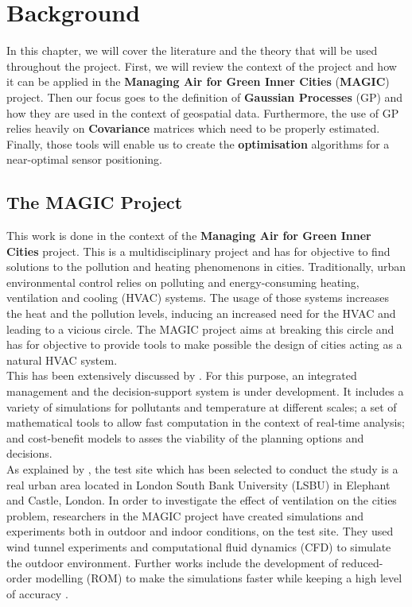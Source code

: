 \chapter{Background}


In this chapter, we will cover the literature and the theory that will be used throughout the project. First, we will review the context of the project and how it can be applied in the \textbf{Managing Air for Green Inner Cities} (\textbf{MAGIC}) project. Then our focus goes to the definition of \textbf{Gaussian Processes} (GP) and how they are used in the context of geospatial data. Furthermore, the use of GP relies heavily on \textbf{Covariance} matrices which need to be properly estimated. Finally, those tools will enable us to create the \textbf{optimisation} algorithms for a near-optimal sensor positioning. 

\section{The MAGIC Project}

This work is done in the context of the \textbf{Managing Air for Green Inner Cities} project. This is a multidisciplinary project and has for objective to find solutions to the pollution and heating phenomenons in cities. Traditionally, urban environmental control relies on polluting and energy-consuming heating, ventilation and cooling (HVAC) systems. The usage of those systems increases the heat and the pollution levels, inducing an increased need for the HVAC and leading to a vicious circle. The MAGIC project aims at breaking this circle and has for objective to provide tools to make possible the design of cities acting as a natural HVAC system. \\


This has been extensively discussed by  \cite{song_natural_2018}.  For this purpose, an integrated management and the decision-support system is under development. It includes a variety of simulations for pollutants and temperature at different scales; a set of mathematical tools to allow fast computation in the context of real-time analysis; and cost-benefit models to asses the viability of the planning options and decisions. \\

As explained by \cite{song_natural_2018}, the test site which has been selected to conduct the study is a real urban area located in London South Bank University (LSBU) in  Elephant and Castle, London. In order to investigate the effect of ventilation on the cities problem, researchers in the MAGIC project have created simulations and experiments both in outdoor and indoor conditions, on the test site. They used wind tunnel experiments and computational fluid dynamics (CFD) to simulate the outdoor environment. Further works include the development of reduced-order modelling (ROM) to make the simulations faster while keeping a high level of accuracy \citep{arcucci_effective_2018}. \\

